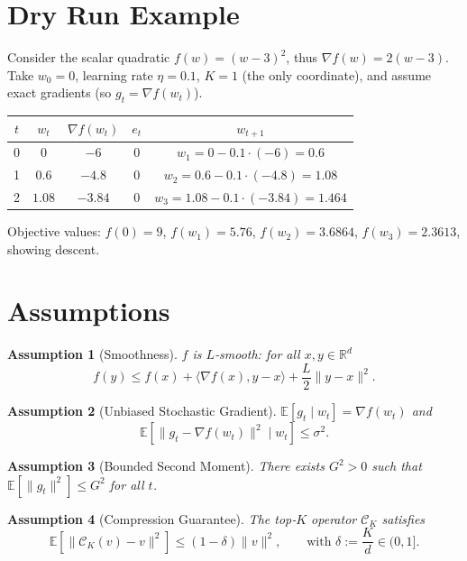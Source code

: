 \documentclass{article}
\newtheorem{assumption}{Assumption}
\begin{document}
\section*{Dry Run Example}
Consider the scalar quadratic $f(w)=(w-3)^{2}$, thus $\nabla f(w)=2(w-3)$.  
Take $w_{0}=0$, learning rate $\eta=0.1$, $K=1$ (the only coordinate), and assume exact gradients (so $g_{t}=\nabla f(w_{t})$).  

\begin{center}
\begin{tabular}{c|c|c|c|c}
$t$ & $w_{t}$ & $\nabla f(w_{t})$ & $e_{t}$ & $w_{t+1}$ \\ \hline
0 & $0$ & $-6$ & $0$ & $w_{1}=0-0.1\cdot(-6)=0.6$ \\[4pt]
1 & $0.6$ & $-4.8$ & $0$ & $w_{2}=0.6-0.1\cdot(-4.8)=1.08$ \\[4pt]
2 & $1.08$ & $-3.84$ & $0$ & $w_{3}=1.08-0.1\cdot(-3.84)=1.464$ 
\end{tabular}
\end{center}
Objective values: $f(0)=9$, $f(w_{1})=5.76$, $f(w_{2})=3.6864$, $f(w_{3})=2.3613$, showing descent.

\newpage

\section*{Assumptions}
\begin{assumption}[Smoothness]\label{ass:smooth}
$f$ is $L$‑smooth: for all $x,y\in\mathbb{R}^{d}$
\[
f(y)\le f(x)+\langle\nabla f(x),y-x\rangle+\frac{L}{2}\|y-x\|^{2}.
\]
\end{assumption}
\begin{assumption}[Unbiased Stochastic Gradient]\label{ass:unbiased}
$\mathbb{E}[g_{t}\mid w_{t}]=\nabla f(w_{t})$ and 
\[
\mathbb{E}\!\left[\|g_{t}-\nabla f(w_{t})\|^{2}\mid w_{t}\right]\le\sigma^{2}.
\]
\end{assumption}
\begin{assumption}[Bounded Second Moment]\label{ass:bounded}
There exists $G^{2}>0$ such that $\mathbb{E}\!\left[\|g_{t}\|^{2}\right]\le G^{2}$ for all $t$.
\end{assumption}
\begin{assumption}[Compression Guarantee]\label{ass:compress}
The top‑$K$ operator $\mathcal{C}_{K}$ satisfies
\[
\mathbb{E}\!\left[\| \mathcal{C}_{K}(v)-v\|^{2}\right]\le (1-\delta)\|v\|^{2},
\qquad\text{with }\delta:=\frac{K}{d}\in(0,1].
\]
\end{assumption}
\end{document}
